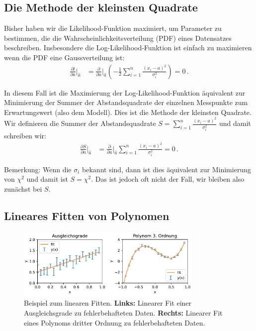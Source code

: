 \subsection{Die Methode der kleinsten Quadrate}
\label{subsec:vl8-4}

Bisher haben wir die Likelihood-Funktion maximiert, um Parameter zu bestimmen, die die Wahrscheinlichkeitsverteilung (PDF) eines Datensatzes beschreiben. Insbesondere die Log-Likelihood-Funktion ist einfach zu maximieren wenn die PDF eine Gaussverteilung ist:
\begin{align}
\frac{ \partial l }{ \partial a } \bigg|_{\hat{a}} &= \frac{ \partial }{ \partial a } \bigg|_{\hat{a}} \left( - \frac{1}{2} \sum_{i=1}^n \frac{ (x_i - a)^2 }{ \sigma_i^2 } \right) = 0\,.
\label{eq:vl8-17}
\end{align}

In diesem Fall ist die Maximierung der Log-Likelihood-Funktion \"aquivalent zur Minimierung der Summer der  Abstandsquadrate der einzelnen Messpunkte zum Erwartungswert (also dem Modell). Dies ist die Methode der kleinsten Quadrate.
Wir definieren die Summer der Abstandsquadrate $S = \sum_{i=1}^n \frac{ (x_i - a)^2 }{ \sigma_i^2 }$ und damit schreiben wir:
\begin{align}
\frac{ \partial S }{ \partial a } \bigg|_{\hat{a}} &= \frac{ \partial }{ \partial a } \bigg|_{\hat{a}} \sum_{i=1}^n \frac{ (x_i - a)^2 }{ \sigma_i^2 } = 0\,.
\label{eq:vl8-18}
\end{align}

Bemerkung: Wenn die $\sigma_i$ bekannt sind, dann ist dies \"aquivalent zur Minimierung von $\chi^2$ und damit ist $S = \chi^2$. Das ist jedoch oft nicht der Fall, wir bleiben also zun\"achst bei $S$.


\subsection{Lineares Fitten von Polynomen}
\label{subsec:vl8-5}

\begin{figure}[tbp]
    \centering
        \includegraphics[width=0.8\textwidth]{Figures/linear_fitting_image.pdf}
        \caption{Beispiel zum linearen Fitten. \textbf{Links:} Linearer Fit einer Ausgleichsgrade zu fehlerbehafteten Daten. \textbf{Rechts:} Linearer Fit eines Polynoms dritter Ordnung zu fehlerbehafteten Daten. }
        \label{fig:linearFit}
\end{figure} 

